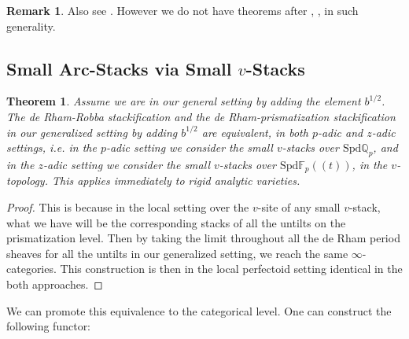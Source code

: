 \documentclass[12pt]{article}
\newtheorem{theorem}{Theorem}
\theoremstyle{definition}
\newtheorem{remark}{Remark}
\begin{document}
\begin{remark}
Also see \cite{1AB}. However we do not have theorems after \cite{1M}, \cite{1K}, \cite{1A} in such generality.
\end{remark}





\subsection{Small Arc-Stacks via Small $v$-Stacks}


\begin{theorem}
Assume we are in our general setting by adding the element $b^{1/2}$. The de Rham-Robba stackification and the de Rham-prismatization stackification in our generalized setting by adding $b^{1/2}$ are equivalent, in both $p$-adic and $z$-adic settings, i.e. in the $p$-adic setting we consider the small $v$-stacks over $\mathrm{Spd}\mathbb{Q}_p$, and in the $z$-adic setting we consider the small $v$-stacks over $\mathrm{Spd}\mathbb{F}_p((t))$, in the $v$-topology. This applies immediately to rigid analytic varieties.
\end{theorem}

\begin{proof}
This is because in the local setting over the $v$-site of any small $v$-stack, what we have will be the corresponding stacks of all the untilts on the prismatization level. Then by taking the limit throughout all the de Rham period sheaves for all the untilts in our generalized setting, we reach the same $\infty$-categories. This construction is then in the local perfectoid setting identical in the both approaches.
\end{proof}


\noindent We can promote this equivalence to the categorical level. One can construct the following functor:
\end{document}

